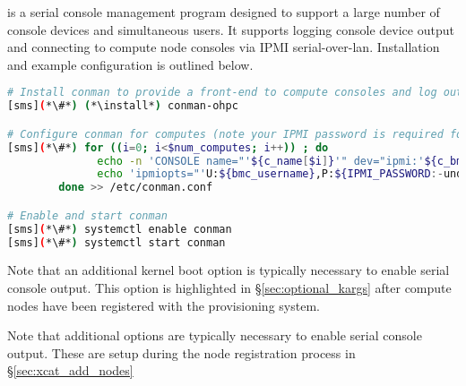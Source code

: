 \conman{} is a serial console management program designed to support a large
number of console devices and simultaneous users. It supports logging console
device output and connecting to compute node consoles via IPMI
serial-over-lan. Installation and example configuration is outlined below.

\begin{lstlisting}[language=bash,keywords={},upquote=true]
# Install conman to provide a front-end to compute consoles and log output
[sms](*\#*) (*\install*) conman-ohpc

# Configure conman for computes (note your IPMI password is required for console access)
[sms](*\#*) for ((i=0; i<$num_computes; i++)) ; do
              echo -n 'CONSOLE name="'${c_name[$i]}'" dev="ipmi:'${c_bmc[$i]}'" '
              echo 'ipmiopts="'U:${bmc_username},P:${IPMI_PASSWORD:-undefined},W:solpayloadsize'"'
        done >> /etc/conman.conf

# Enable and start conman
[sms](*\#*) systemctl enable conman
[sms](*\#*) systemctl start conman
\end{lstlisting}

\noindent Note that an additional kernel boot option is typically necessary to
enable serial console output. This option is highlighted in \S\ref{sec:optional_kargs} after
compute nodes have been registered with the provisioning system.
\fi

\noindent Note that additional options are typically necessary to
enable serial console output. These are setup during the node registration
process in \S\ref{sec:xcat_add_nodes} 
\fi


